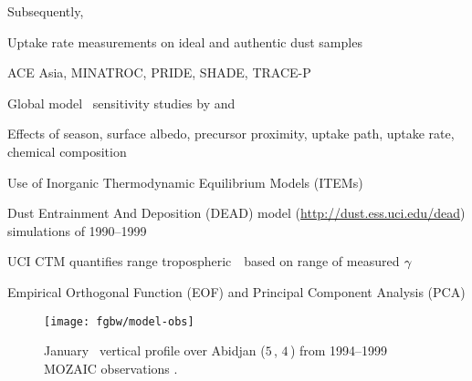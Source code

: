 \documentclass[final,dvips]{foils}
\begin{document}
\rotatefoilhead{\bgl
\Large\textcolor{blue}{\hfill Recent Work \hfill}}\vspace{-0.75in}\large
Subsequently, 
\begin{enumerate*}
\item Uptake rate measurements on ideal and authentic dust samples 
  \cite{USP01,MUG02,HaC01a,HaC03a,HaC03b}
\item ACE Asia, MINATROC, PRIDE, SHADE, TRACE-P
\item Global model \Ot\ sensitivity studies by
  \cite{MJL02,BiZ03,BiZ04} and \cite{BBS04}  
\begin{itemize*}
\item Effects of season, surface albedo, precursor proximity, uptake
path, uptake rate, chemical composition 
\end{itemize*}
\item Use of Inorganic Thermodynamic Equilibrium Models (ITEMs) \cite[]{MDKJ02,RoD041}
\end{enumerate*}

\rotatefoilhead{\bgl
\Large\textcolor{blue}{\hfill Modeling Strategy \hfill}}\vspace{-0.5in}\large
\begin{enumerate*}
\item Dust Entrainment And Deposition (DEAD) model
  (\url{http://dust.ess.uci.edu/dead}) simulations of 1990--1999  
\item UCI CTM quantifies range tropospheric~\Ot\ based on range of
  measured $\gamma$ 
\item Empirical Orthogonal Function (EOF) and Principal
  Component Analysis (PCA)
\end{enumerate*}

\foilhead{
\Large\textcolor{blue}{\hfill MOZAIC Comparison: Abidjan\hfill}}\vspace{-0.5in}\large
\enlargethispage*{1in} 
\begin{figure}
\begin{center}
\texttt{[image: fgbw/model-obs]}%
\end{center}
\caption{January \Ot\ vertical profile over Abidjan ($5$\,\dgrn,
$4$\,\dgrw) from 1994--1999 MOZAIC observations \cite[]{MJL02}.
} 
\label{fgr:model-obs}
\end{figure}
\end{document}
